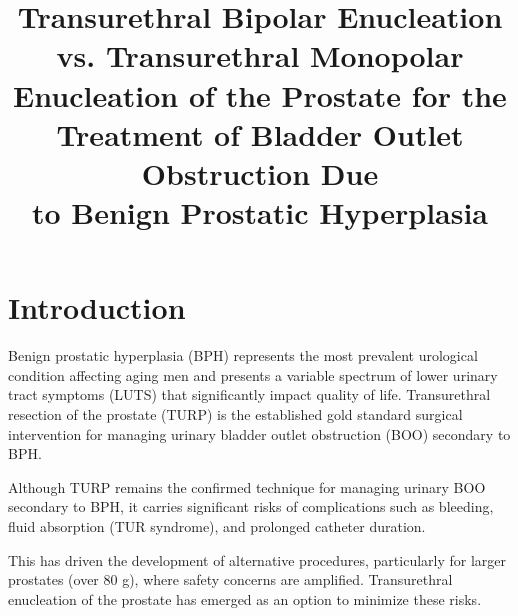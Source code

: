\documentclass{tnqjournal}
\title{Transurethral Bipolar Enucleation vs. Transurethral Monopolar Enucleation of the Prostate for the Treatment of Bladder Outlet Obstruction Due\\to Benign Prostatic Hyperplasia}
\begin{document}
\maketitle
\section{Introduction}
Benign prostatic hyperplasia (BPH) represents the most prevalent urological condition affecting aging men and presents a variable spectrum of lower urinary tract symptoms (LUTS) that significantly impact quality of life. Transurethral resection of the prostate (TURP) is the established gold standard surgical intervention for managing urinary bladder outlet obstruction (BOO) secondary to BPH.

Although TURP remains the confirmed technique for managing urinary BOO secondary to BPH, it carries significant risks of complications such as bleeding, fluid absorption (TUR syndrome), and prolonged catheter duration.

This has driven the development of alternative procedures, particularly for larger prostates (over 80 g), where safety concerns are amplified. Transurethral enucleation of the prostate has emerged as an option to minimize these risks.
\end{document}
